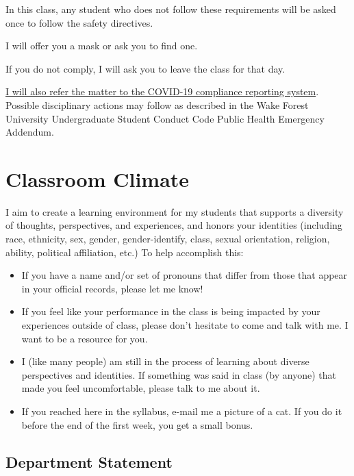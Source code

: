 \documentclass[11pt,]{article}
\begin{document}
In this class, any student who does not follow these requirements will
be asked once to follow the safety directives.

I will offer you a mask or ask you to find one.

If you do not comply, I will ask you to leave the class for that day.

\href{https://cm.maxient.com/reportingform.php?WakeForestUniv\&layout_id=40}{I
will also refer the matter to the COVID-19 compliance reporting system}.
Possible disciplinary actions may follow as described in the Wake Forest
University Undergraduate Student Conduct Code Public Health Emergency
Addendum.

\hypertarget{classroom-climate}{%
\section{Classroom Climate}\label{classroom-climate}}

I aim to create a learning environment for my students that supports a
diversity of thoughts, perspectives, and experiences, and honors your
identities (including race, ethnicity, sex, gender, gender-identify,
class, sexual orientation, religion, ability, political affiliation,
etc.) To help accomplish this:

\begin{itemize}
\item
  If you have a name and/or set of pronouns that differ from those that
  appear in your official records, please let me know!
\item
  If you feel like your performance in the class is being impacted by
  your experiences outside of class, please don't hesitate to come and
  talk with me. I want to be a resource for you.
\item
  I (like many people) am still in the process of learning about diverse
  perspectives and identities. If something was said in class (by
  anyone) that made you feel uncomfortable, please talk to me about it.
\item
  If you reached here in the syllabus, e-mail me a picture of a cat. If
  you do it before the end of the first week, you get a small bonus.
\end{itemize}

\hypertarget{department-statement}{%
\subsection{Department Statement}\label{department-statement}}
\end{document}
